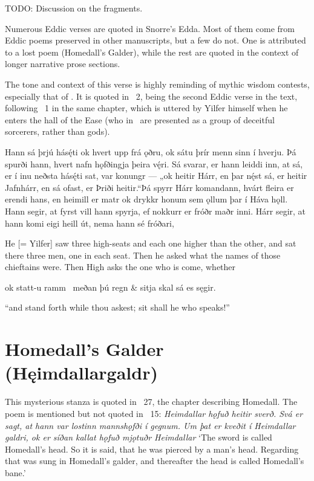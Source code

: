 
TODO: Discussion on the fragments.

Numerous Eddic verses are quoted in Snorre’s Edda. Most of them come from Eddic poems preserved in other manuscripts, but a few do not. One is attributed to a lost poem (Homedall’s Galder), while the rest are quoted in the context of longer narrative prose sections.

\sectionline

The tone and context of this verse is highly reminding of mythic wisdom contests, especially that of \Vafthrudnismal. It is quoted in \Gylfaginning\ 2, being the second Eddic verse in the text, following \Havamal\ 1 in the same chapter, which is uttered by Yilfer himself when he enters the hall of the Ease (who in \Gylfaginning\ are presented as a group of deceitful sorcerers, rather than gods).

\bpg\bpa Hann sá þrjú hásę́ti ok hvert upp frá ǫðru, ok sátu þrír menn sinn í hverju. Þá spurði hann, hvert nafn hǫfðingja þeira vę́ri. Sá svarar, er hann leiddi inn, at sá, er í inu neðsta hásę́ti sat, var konungr — „ok heitir Hárr, en þar nę́st sá, er heitir Jafnhárr, en sá ofast, er Þriði heitir.“Þá spyrr Hárr komandann, hvárt fleira er erendi hans, en heimill er matr ok drykkr honum sem ǫllum þar í Háva hǫll. Hann segir, at fyrst vill hann spyrja, ef nokkurr er fróðr maðr inni. Hárr segir, at hann komi eigi heill út, nema hann sé fróðari,\epa

\bpb He [= Yilfer] saw three high-seats and each one higher than the other, and sat there three men, one in each seat. Then he asked what the names of those chieftains were. Then High asks the one who is come, whether  \epb\epg

\bvg
\bva ok statt-u ramm \hld\ meðan þú regn &
\ind sitja skal sá es sęgir.\eva

\bvb “and stand forth while thou askest; sit shall he who speaks!”\evb
\evg

\sectionline

\section{Homedall’s Galder (Hęimdallargaldr)}

This mysterious stanza is quoted in \Gylfaginning\ 27, the chapter describing Homedall. The poem is mentioned but not quoted in \Skaldskaparmal\ 15: \emph{Heimdallar hǫfuð heitir sverð. Svá er sagt, at hann var lostinn mannshǫfði í gegnum. Um þat er kveðit í Heimdallar galdri, ok er síðan kallat hǫfuð mjǫtuðr Heimdallar} ‘The sword is called Homedall’s head. So it is said, that he was pierced by a man’s head. Regarding that was sung in Homedall’s galder, and thereafter the head is called Homedall’s bane.’

